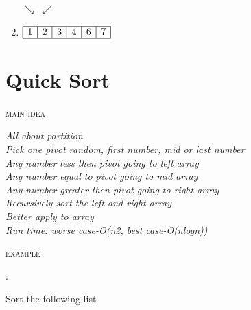 \documentclass[12pt, letterpaper]{article}
\newcommand{\idea}[1]{
\noindent
\begin{minipage}[t]{0.15\textwidth}
	\textsc{main idea}
\end{minipage}
\hspace{-0.8cm}\vline\hspace{0.05cm}
\begin{minipage}[t]{0.88\textwidth}
	\textit{#1}
\end{minipage}\vspace{0.25cm}}
\newcommand{\example}[1]{
\noindent
\begin{minipage}[t]{0.02\textwidth}
	\textsc{example}
\end{minipage}
\hspace{1.6cm}:\hspace{0.05cm}
\begin{minipage}[t]{0.88\textwidth}
	\textnormal{#1}
\end{minipage}\vspace{0.25cm}}
\begin{document}
\begin{minipage}{0.8\textwidth}
\begin{enumerate}
		\hspace{0.8cm}$\searrow$
		\hspace{0.8cm}$\swarrow$
		\item
		$\begin{array}{|l|c|c|c|c|r|}
			\hline
			1 & 2 & 3 & 4 & 6 & 7 \\
			\hline
		\end{array}$
	\end{enumerate}
\end{minipage}

\newpage

\section{Quick Sort}
\idea{All about partition\\
	  Pick one pivot random, first number, mid or last number\\
	  Any number less then pivot going to left array\\
	  Any number equal to pivot going to mid array\\
	  Any number greater then pivot going to right array\\
	  Recursively sort the left and right array\\
	  Better apply to array\\
	  Run time: worse case-O(n\^{2}, best case-O(nlogn))}
\example{Sort the following list}
\end{document}

